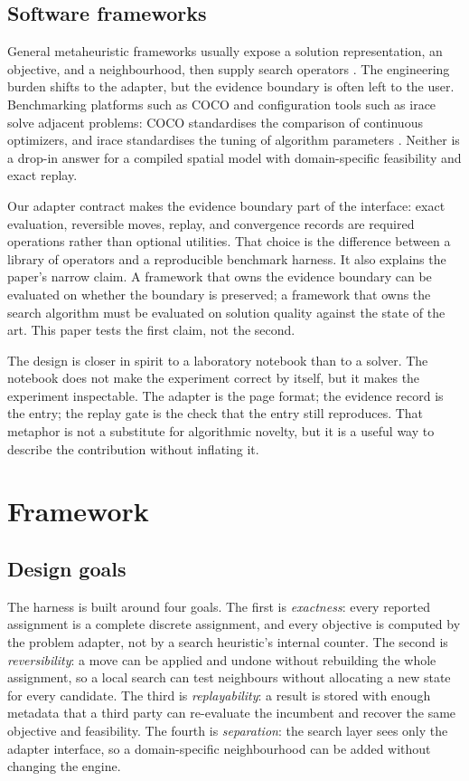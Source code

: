 \documentclass[pdflatex,sn-mathphys-num]{sn-jnl}
\begin{document}
\subsection{Software frameworks}

General metaheuristic frameworks usually expose a solution representation, an objective, and a
neighbourhood, then supply search operators \citep{blum2003,hoos2004}. The engineering burden shifts
to the adapter, but the evidence boundary is often left to the user. Benchmarking platforms such as
COCO and configuration tools such as irace solve adjacent problems: COCO standardises the comparison
of continuous optimizers, and irace standardises the tuning of algorithm parameters
\citep{hansen2020,lopez2016}. Neither is a drop-in answer for a compiled spatial model with
domain-specific feasibility and exact replay.

Our adapter contract makes the evidence boundary part of the interface: exact evaluation, reversible
moves, replay, and convergence records are required operations rather than optional utilities. That
choice is the difference between a library of operators and a reproducible benchmark harness. It also
explains the paper's narrow claim. A framework that owns the evidence boundary can be evaluated on
whether the boundary is preserved; a framework that owns the search algorithm must be evaluated on
solution quality against the state of the art. This paper tests the first claim, not the second.

The design is closer in spirit to a laboratory notebook than to a solver. The notebook does not make
the experiment correct by itself, but it makes the experiment inspectable. The adapter is the page
format; the evidence record is the entry; the replay gate is the check that the entry still
reproduces. That metaphor is not a substitute for algorithmic novelty, but it is a useful way to
describe the contribution without inflating it.

\section{Framework}
\label{sec:framework}

\subsection{Design goals}

The harness is built around four goals. The first is \emph{exactness}: every reported assignment is a
complete discrete assignment, and every objective is computed by the problem adapter, not by a search
heuristic's internal counter. The second is \emph{reversibility}: a move can be applied and undone
without rebuilding the whole assignment, so a local search can test neighbours without allocating a
new state for every candidate. The third is \emph{replayability}: a result is stored with enough
metadata that a third party can re-evaluate the incumbent and recover the same objective and
feasibility. The fourth is \emph{separation}: the search layer sees only the adapter interface, so a
domain-specific neighbourhood can be added without changing the engine.
\end{document}
